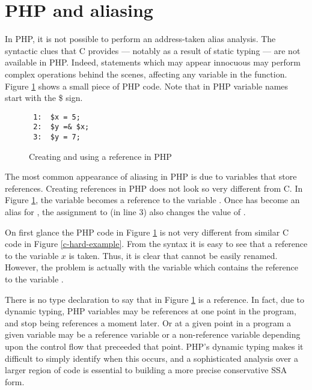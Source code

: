 \section{PHP and aliasing}


In PHP, it is not possible to perform an address-taken alias analysis.
The syntactic clues that C provides --- notably as a result of static
typing --- are not available in PHP.  Indeed, statements which may
appear innocuous may perform complex operations behind the scenes,
affecting any variable in the function. Figure \ref{php-reference}
shows a small piece of PHP code. Note that in PHP variable names
start with the \$ sign.

\begin{figure}[thp]
\begin{verbatim}
 1:  $x = 5;
 2:  $y =& $x;
 3:  $y = 7;
\end{verbatim}
\caption{Creating and using a reference in PHP}
\label{php-reference}
\end{figure}

The most common appearance of aliasing in PHP is due to variables that
store references. Creating references in PHP does not look so very
different from C. In Figure \ref{php-reference}, the variable 
becomes a reference to the variable . Once  has become an alias
for , the assignment to  (in line 3) also changes the value of
.

On first glance the PHP code in Figure \ref{php-reference} is not very
different from similar C code in Figure \ref{c-hard-example}. From the
syntax it is easy to see that a reference to the variable $x$ is
taken.  Thus, it is clear that  cannot be easily renamed. However,
the problem is actually with the variable  which contains the
reference to the variable .

There is no type declaration to say that  in Figure
\ref{php-reference} is a reference. In fact, due to dynamic typing,
PHP variables may be references at one point in the program, and stop
being references a moment later. Or at a given point in a program a
given variable may be a reference variable or a non-reference variable
depending upon the control flow that preceeded that point.  PHP's
dynamic typing makes it difficult to simply identify when this occurs,
and a sophisticated analysis over a larger region of code is essential
to building a more precise conservative SSA form.

